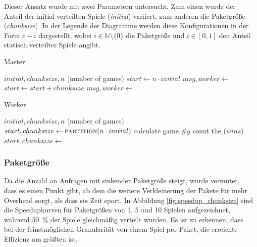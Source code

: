 Dieser Ansatz wurde mit zwei Parametern untersucht. Zum
einen wurde der Anteil der initial verteilten Spiele (\emph{initial}) variiert,
zum anderen die Paketgröße (\emph{chunksize}). In der Legende der Diagramme
werden diese Konfigurationen in der Form $c-i$ dargestellt, wobei $i \in
\mathbb{N} \setminus \{0\}$ die Paketgröße und $i \in [0, 1]$ den Anteil
statisch verteilter Spiele angibt.

\begin{algorithm}
    \caption{Master}
    \label{alg:master}
    \begin{algorithmic}[1]
        \Require $initial, chunksize, n$ (number of games)
        \State $start \gets n \cdot initial$
            \State $msg, worker \gets $
            \State {}
            \State $start \gets start + chunksize$
        \EndWhile
            \State $msg, worker \gets $
            \State {}
        \EndFor
    \end{algorithmic}
\end{algorithm}
\begin{algorithm}
    \caption{Worker}
    \label{alg:worker}
    \begin{algorithmic}[1]
        \Require $initial, chunksize, n$ (number of games)
        \State $start, chunksize \gets \Call{partition}{n \cdot initial}$
            \For {$g \in [start, start + chunksize)$}
                \State calculate game $\#g$
                \State count the ($wins$)
            \EndFor
            \State {}
            \State $start, chunksize \gets $
        \EndWhile
    \end{algorithmic}
\end{algorithm}

\subsubsection{Paketgröße}
Da die Anzahl an Anfragen mit sinkender Paketgröße steigt, wurde vermutet, dass
es einen Punkt gibt, ab dem die weitere Verkleinerung der Pakete für mehr
Overhead sorgt, als dass sie Zeit spart.
In Abbildung \ref{fig:speedup_chunksize} sind die Speedupkurven für Paketgrößen
von 1, 5 und 10 Spielen aufgezeichnet, während \SI{50}{\percent} der Spiele
gleichmäßig verteilt wurden. Es ist zu erkennen, dass bei der feinstmöglichen
Granularität von einem Spiel pro Paket, die erreichte Effizienz am größten ist.

